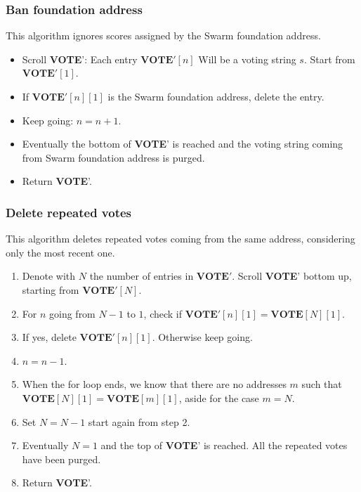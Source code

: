 \documentclass[submission, copyright,creativecommons,sharealike,noncommercial]{eptcs}
\newcommand{\Vote}{\textbf{VOTE}\xspace}
\begin{document}
	
\subsubsection{Ban foundation address}\label{subsubsec:Ban foundation address}
	This algorithm ignores scores assigned by the Swarm foundation address.
	\begin{itemize}
		\item Scroll \Vote': Each entry $\Vote'[n]$ Will be a voting string $s$. Start from $\Vote'[1]$.	
		\item If $\Vote'[n][1]$ is the Swarm foundation address, delete the entry.
		\item Keep going: $n = n+1$. 
		\item Eventually the bottom of \Vote' is reached and the voting string coming from Swarm foundation address is purged.
		\item Return \Vote'.
	\end{itemize}	

	
\subsubsection{Delete repeated votes}\label{subsubsec:Delete repeated votes}
	This algorithm deletes repeated votes coming from the same address, considering only the most recent one.
	\begin{enumerate}
		\item Denote with $N$ the number of entries in $\Vote'$. Scroll \Vote' bottom up, starting from $\Vote'[N]$.
		\item  For $n$ going from $N-1$ to $1$, check if $\Vote'[n][1] = \Vote[N][1]$.
		\item If yes, delete $\Vote'[n][1]$. Otherwise keep going.
		\item $n = n-1$.		
		\item When the for loop ends, we know that there are no addresses $m$ such that $\Vote[N][1] = \Vote[m][1]$, aside for the case $m=N$.
		\item Set $N = N-1$ start again from step 2.
		\item Eventually $N=1$ and the top of \Vote' is reached. All the repeated votes have been purged.
		\item Return \Vote'.
	\end{enumerate}
\end{document}
